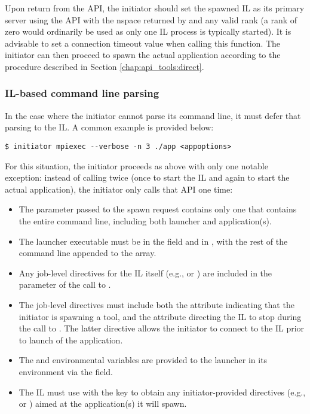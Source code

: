 Upon return from the  \ac{API}, the initiator should set the spawned \ac{IL} as its primary server using the  \ac{API} with the nspace returned by  and any valid rank (a rank of zero would ordinarily be used as only one \ac{IL} process is typically started). It is advisable to set a connection timeout value when calling this function. The initiator can then proceed to spawn the actual application according to the procedure described in Section \ref{chap:api_tools:direct}.

\subsubsection{\ac{IL}-based command line parsing}
\label{chap:api_tools:indirect:tool}

In the case where the initiator cannot parse its command line, it must defer that parsing to the \ac{IL}. A common example is provided below:

\begin{verbatim}
$ initiator mpiexec --verbose -n 3 ./app <appoptions>
\end{verbatim}

For this situation, the initiator proceeds as above with only one notable exception: instead of calling  twice (once to start the \ac{IL} and again to start the actual application), the initiator only calls that \ac{API} one time:

\begin{itemize}
    \item The  parameter passed to the spawn request contains only one  that contains the entire command line, including both launcher and application(s).
    \item The launcher executable must be in the  field and in , with the rest of the command line appended to the  array.
    \item Any job-level directives for the \ac{IL} itself (e.g.,  or ) are included in the  parameter of the call to .
    \item The job-level directives must include both the  attribute indicating that the initiator is spawning a tool, and the  attribute directing the \ac{IL} to stop during the call to . The latter directive allows the initiator to connect to the \ac{IL} prior to launch of the application.
    \item The  and  environmental variables are provided to the launcher in its environment via the  field.
    \item The \ac{IL} must use  with the  key to obtain any initiator-provided directives (e.g.,  or ) aimed at the application(s) it will spawn.
\end{itemize}

